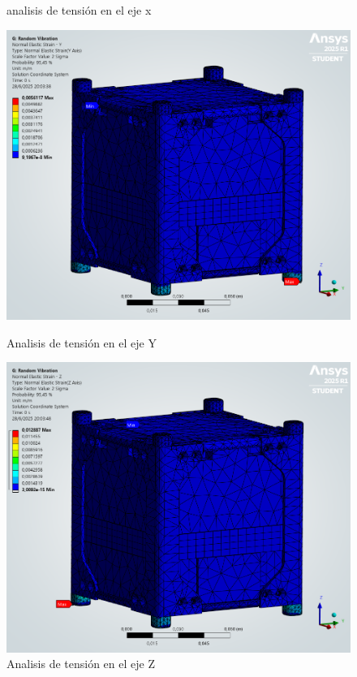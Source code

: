 \begin{figure}[h]
\begin{minipage}{0.5\textwidth}
          \caption{analisis de tensión en el eje x}
          \label{fig:fem_strain-x}
        \end{minipage}
      \end{figure}
      \begin{figure}[H]
        \begin{minipage}{0.5\textwidth}
          \centering
          \includegraphics[width=\textwidth]{image/fem/ansys_cubesat-vibration_strain-y.png}
          \caption{Analisis de tensión en el eje Y}
          \label{fig:fem_strain-y}
        \end{minipage}
        \begin{minipage}{0.5\textwidth}
          \centering
          \includegraphics[width=\textwidth]{image/fem/ansys_cubesat-vibration_strain-z.png}
          \caption{Analisis de tensión en el eje Z}
          \label{fig:fem_strain-z}
        \end{minipage}
      \end{figure}

